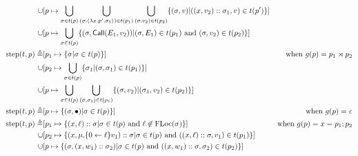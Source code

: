 \documentclass{article}
\begin{document}
\begin{align*}
  \cup                  & [p\mapsto\bigcup_{\sigma\in t(p)}\bigcup_{(\sigma,\langle\lambda x.p',\sigma_1\rangle)\in t(p_1)}\bigcup_{(\sigma,v_2)\in t(p_2)}\{(\sigma,v)|((x,v_2)::\sigma_1,v)\in t(p')\}]                                                                    \\
  \cup                  & [p\mapsto\bigcup_{\sigma\in t(p)}\{(\sigma,\textsf{Call}(E_1,v_2))|(\sigma,E_1)\in t(p_1)\text{ and }(\sigma,v_2)\in t(p_2)\}]                                                                                                                 \\
  \text{step}(t,p) \triangleq & [p_1\mapsto\{\sigma|\sigma\in t(p)\}]                                                                                                                                      & \text{when }g(p)={p_1}\rtimes{p_2}                                 \\
  \cup                  & [p_2\mapsto\bigcup_{\sigma\in t(p)}\{\sigma_1|(\sigma,\sigma_1)\in t(p_1)\}]                                                                                                                                                                      \\
  \cup                  & [p\mapsto\bigcup_{\sigma\in t(p)}\bigcup_{(\sigma,\sigma_1)\in t(p_1)}\{(\sigma,v_2)|(\sigma_1,v_2)\in t(p_2)\}]                                                                                                                                    \\
  \text{step}(t,p) \triangleq & [p\mapsto\{(\sigma,\bullet)|\sigma\in t(p)\}]                                                                                                                              & \text{when }g(p)=\varepsilon                                     \\
  \text{step}(t,p) \triangleq & [p_1\mapsto\{(x,\ell)::\sigma|\sigma\in t(p)\text{ and }\ell\not\in\text{FLoc}(\sigma)\}]                                                                                       & \text{when }g(p)=x=p_1;p_2                                       \\
  \cup                  & [p_2\mapsto\{(x,\mu.\{0\leftarrow{\ell}\}{v_1})::\sigma|\sigma\in t(p)\text{ and }((x,\ell)::\sigma,v_1)\in t(p_1)\}]                                                                                                                           \\
  \cup                  & [p\mapsto\{(\sigma,(x,w_1)::\sigma_2)|\sigma\in t(p)\text{ and }((x,w_1)::\sigma,\sigma_2)\in t(p_2)\}]
\end{align*}
\end{document}

